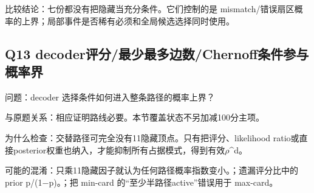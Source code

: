 \documentclass[11pt,a4paper]{article}
\begin{document}
比较结论：七份都没有把隐藏当充分条件。它们控制的是 mismatch/错误扇区概率的上界；局部事件是否稀有必须和全局候选选择同时使用。

\clearpage
\subsection{Q13 decoder评分/最少最多边数/Chernoff条件参与概率界}
\label{aspect:Q13}
问题：decoder 选择条件如何进入整条路径的概率上界？

与原题关系：相应证明路线必要。本节覆盖状态不另加减100分主项。

为什么检查：交替路径可完全没有11隐藏顶点。只有把评分、likelihood ratio或直接posterior权重也纳入，才能抑制所有占据模式，得到有效\ensuremath{\rho}\textasciicircum{}d。

可能的混淆：只乘11隐藏因子就认为任何路径概率指数变小。；遗漏评分比中的 prior p/(1\ensuremath{-}p)。；把 min-card 的“至少半路径active”错误用于 max-card。
\end{document}
